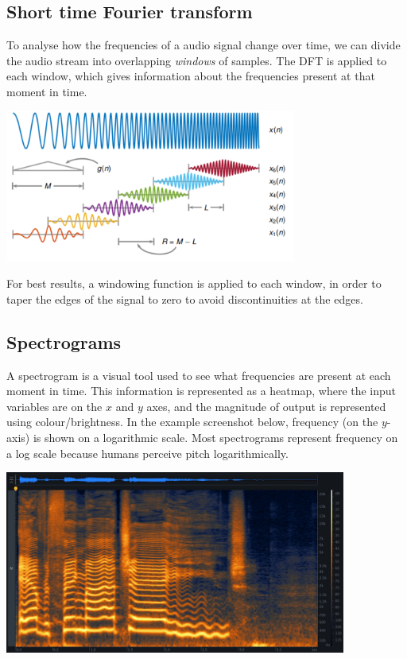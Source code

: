 \subsection{Short time Fourier transform}
To analyse how the frequencies of a audio signal change over time, we can
divide the audio stream into overlapping \emph{windows} of samples.
The DFT is applied to each window, which gives information about the frequencies
present at that moment in time.

\begin{center}\includegraphics[height=5cm]{assets/windowing.png}\end{center}

For best results, a windowing function is applied to each window, in order
to taper the edges of the signal to zero to avoid discontinuities at the edges.

\pagebreak

\subsection{Spectrograms}
A spectrogram is a visual tool used to see what frequencies are present at 
each moment in time.
This information is represented as a heatmap, where the input variables are on the $x$ and $y$ axes,
and the magnitude of output is represented using colour/brightness.
In the example screenshot below, frequency (on the $y$-axis) is shown on a logarithmic scale.
Most spectrograms represent frequency on a log scale because humans perceive pitch logarithmically.

\begin{center}\includegraphics[height=6cm]{assets/spectrogram.jpg}\end{center}

